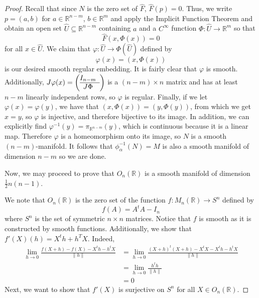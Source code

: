\documentclass{article}
\theoremstyle{plain} %
\numberwithin{thm}{section} %
\theoremstyle{definition}
\begin{document}
\begin{proof}
            Recall that since \(N\) is the zero set of \(\hat{F}\), \(\hat{F}(p) = 0\). Thus, we write \(p = (a,b)\) for \(a \in \mathbb{R}^{n-m}\), \(b \in \mathbb{R}^{m}\) and apply the Implicit Function Theorem and obtain an open set \(\hat{U} \subseteq \mathbb{R}^{n-m}\) containing \(a\) and a \(C^{\infty}\) function \(\Phi : \hat{U} \to \mathbb{R}^{m}\) so that
            \[
                \hat{F}(x, \Phi(x)) = 0
            \]
            for all \(x \in \hat{U}\). We claim that \(\varphi: \hat{U} \to \Phi (\hat{U})\) defined by
            \[
                \varphi (x) = (x, \Phi (x))
            \]
            is our desired smooth regular embedding. It is fairly clear that \(\varphi\) is smooth. Additionally, \(J \varphi (x) = \left( \begin{array}{@{}cc@{}}
                I_{n-m} \\
                \hline
                J\Phi
            \end{array} \right) \) is a \((n-m) \times n\) matrix and has at least \(n-m\) linearly independent rows, so \(\varphi\) is regular. Finally, if we let \(\varphi (x) = \varphi (y)\), we have that \((x,\Phi (x)) = (y, \Phi (y))\), from which we get \(x=y\), so \(\varphi\) is injective, and therefore bijective to its image. In addition, we can explicitly find \(\varphi^{-1} (y) = \pi _{\mathbb{R}^{n-m}}(y)\), which is continuous because it is a linear map. Therefore \(\varphi\) is a homeomorphism onto its image, so \(N\) is a smooth \((n-m)\)-manifold. It follows that \(\phi ^{-1}_{\alpha} (N) = M\) is also a smooth manifold of dimension \(n-m\) so we are done.
    
            \medskip
    
            Now, we may proceed to prove that \(O_n(\mathbb{R})\) is a smooth manifold of dimension \(\frac{1}{2}n(n-1)\).
    
            We note that \(O_n(\mathbb{R})\) is the zero set of the function \(f: M_n(\mathbb{R}) \to S^n\) defined by
            \[
                f(A) = A^t A - I_n
            \]
            where \(S^n\) is the set of symmetric \(n\times n\) matrices. Notice that \(f\) is smooth as it is constructed by smooth functions. Additionally, we show that \(f'(X)(h) = X^t h + h^T X\). Indeed,
            \begin{align*}
                \lim_{h \to 0} \frac{f(X + h) - f(X) - X^t h - h^t X}{\|h\|} &= \lim_{h \to 0} \frac{(X + h)^t (X + h) - X^t X - X^t h - h^t X}{\|h\|} \\
                &= \lim_{h \to 0} \frac{h^t h}{\|h\|} \\
                &= 0
            \end{align*}
            Next, we want to show that \(f'(X)\) is surjective on \(S^n\) for all \(X \in O_n(\mathbb{R})\).
    

\end{proof}
\end{document}
